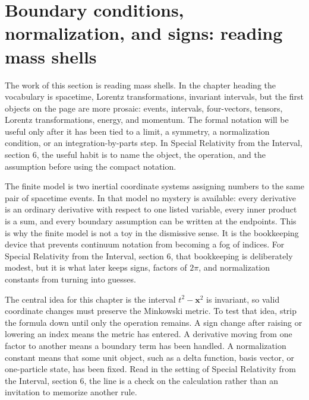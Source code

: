 \section{Boundary conditions, normalization, and signs: reading mass shells}













The work of this section is reading mass shells.  In the chapter heading the vocabulary is spacetime, Lorentz transformations, invariant intervals, but the first objects on the page are more prosaic: events, intervals, four-vectors, tensors, Lorentz transformations, energy, and momentum.  The formal notation will be useful only after it has been tied to a limit, a symmetry, a normalization condition, or an integration-by-parts step.  In Special Relativity from the Interval, section 6, the useful habit is to name the object, the operation, and the assumption before using the compact notation.

The finite model is two inertial coordinate systems assigning numbers to the same pair of spacetime events.  In that model no mystery is available: every derivative is an ordinary derivative with respect to one listed variable, every inner product is a sum, and every boundary assumption can be written at the endpoints.  This is why the finite model is not a toy in the dismissive sense.  It is the bookkeeping device that prevents continuum notation from becoming a fog of indices.  For Special Relativity from the Interval, section 6, that bookkeeping is deliberately modest, but it is what later keeps signs, factors of \(2\pi\), and normalization constants from turning into guesses.

The central idea for this chapter is the interval \(t^2-\bm x^2\) is invariant, so valid coordinate changes must preserve the Minkowski metric.  To test that idea, strip the formula down until only the operation remains.  A sign change after raising or lowering an index means the metric has entered.  A derivative moving from one factor to another means a boundary term has been handled.  A normalization constant means that some unit object, such as a delta function, basis vector, or one-particle state, has been fixed.  Read in the setting of Special Relativity from the Interval, section 6, the line is a check on the calculation rather than an invitation to memorize another rule.

